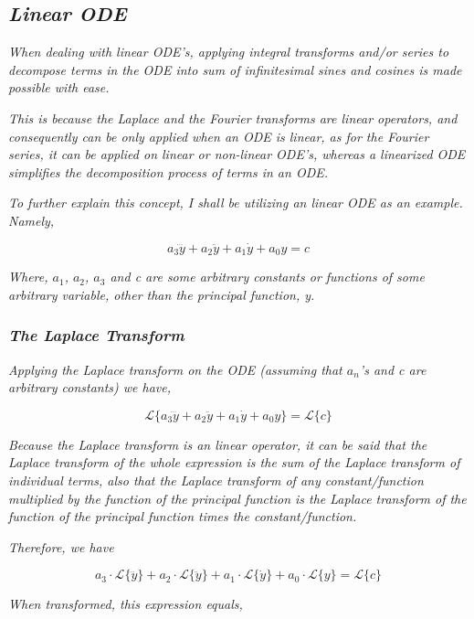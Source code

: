 

\subsection{\textit{Linear ODE}}

	\textit{When dealing with linear ODE's, applying integral transforms and/or series to decompose terms in the ODE into sum of infinitesimal sines and cosines is made possible with ease.} 
	
	\textit{This is because the Laplace and the Fourier transforms are linear operators, and consequently can be only applied when an ODE is linear, as for the Fourier series, it can be applied on linear or non-linear ODE's, whereas a linearized ODE simplifies the decomposition process of terms in an ODE.}

	\textit{To further explain this concept, I shall be utilizing an linear ODE as an example. Namely,}
	
		$$a_3\dddot{y} + a_2\ddot{y} + a_1\dot{y} + a_0y = c$$

	\textit{Where, $a_1$, $a_2$, $a_3$ and c are some arbitrary constants or functions of some arbitrary variable, other than the principal function, y.}

	\subsubsection{\textit{The Laplace Transform}}	
		
		\textit{Applying the Laplace transform on the ODE (assuming that $a_n$'s and c are arbitrary constants) we have,}
		
			$$\mathcal{L}\{a_3\dddot{y} + a_2\ddot{y} + a_1\dot{y} + a_0y\} = \mathcal{L}\{c\}$$		
			
		\textit{Because the Laplace transform is an linear operator, it can be said that the Laplace transform of the whole expression is the sum of the Laplace transform of individual terms, also that the Laplace transform of any constant/function multiplied by the function of the principal function is the Laplace transform of the function of the principal function times the constant/function.}			
			
		\textit{Therefore, we have}			
			
			$$a_3\cdot\mathcal{L}\{\dddot{y}\} + a_2\cdot\mathcal{L}\{\ddot{y}\} + a_1\cdot\mathcal{L}\{\dot{y}\} + a_0\cdot\mathcal{L}\{y\} = \mathcal{L}\{c\}$$
		
		\textit{When transformed, this expression equals,}		
		
